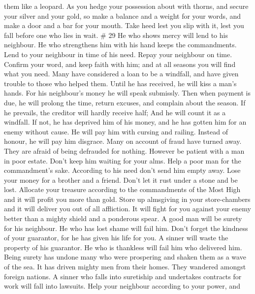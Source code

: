 them like a leopard.  As you hedge your possession about
with thorns, and secure your silver and your gold,  so make
a balance and a weight for your words, and make a door and a bar for
your mouth.  Take heed lest you slip with it, lest you fall
before one who lies in wait. \# 29  He who shows mercy will
lend to his neighbour. He who strengthens him with his hand keeps the
commandments.  Lend to your neighbour in time of his need.
Repay your neighbour on time.  Confirm your word, and keep
faith with him; and at all seasons you will find what you need.
 Many have considered a loan to be a windfall, and have
given trouble to those who helped them.  Until he has
received, he will kiss a man's hands. For his neighbour's money he will
speak submissly. Then when payment is due, he will prolong the time,
return excuses, and complain about the season.  If he
prevails, the creditor will hardly receive half; And he will count it as
a windfall. If not, he has deprived him of his money, and he has gotten
him for an enemy without cause. He will pay him with cursing and
railing. Instead of honour, he will pay him disgrace.  Many
on account of fraud have turned away. They are afraid of being defrauded
for nothing.  However be patient with a man in poor estate.
Don't keep him waiting for your alms.  Help a poor man for
the commandment's sake. According to his need don't send him empty away.
 Lose your money for a brother and a friend. Don't let it
rust under a stone and be lost.  Allocate your treasure
according to the commandments of the Most High and it will profit you
more than gold.  Store up almsgiving in your store-chambers
and it will deliver you out of all affliction.  It will
fight for you against your enemy better than a mighty shield and a
ponderous spear.  A good man will be surety for his
neighbour. He who has lost shame will fail him.  Don't
forget the kindness of your guarantor, for he has given his life for
you.  A sinner will waste the property of his guarantor.
 He who is thankless will fail him who delivered him.
 Being surety has undone many who were prospering and
shaken them as a wave of the sea. It has driven mighty men from their
homes. They wandered amongst foreign nations.  A sinner who
falls into suretiship and undertakes contracts for work will fall into
lawsuits.  Help your neighbour according to your power, and
